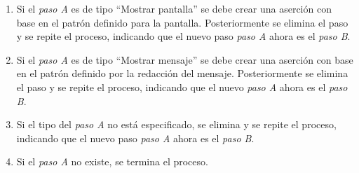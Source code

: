 \begin{enumerate}
\begin{enumerate}
		\end{enumerate}
		 
			\item Si el {\it paso A} es de tipo ``Mostrar pantalla'' se debe crear una aserción con base en el patrón definido para la pantalla. Posteriormente se elimina el paso y se repite el proceso, indicando que el nuevo paso {\it paso A} ahora es el {\it paso B}.
			
			\item Si el {\it paso A} es de tipo ``Mostrar mensaje'' se debe crear una aserción con base en el patrón definido por la redacción del mensaje. Posteriormente se elimina el paso y se repite el proceso, indicando que el nuevo {\it paso A} ahora es el {\it paso B}.
			
			\item Si el tipo del {\it paso A} no está especificado, se elimina y se repite el proceso, indicando que el nuevo paso {\it paso A} ahora es el {\it paso B}.
			
			\item Si el {\it paso A} no existe, se termina el proceso.
	\end{enumerate}